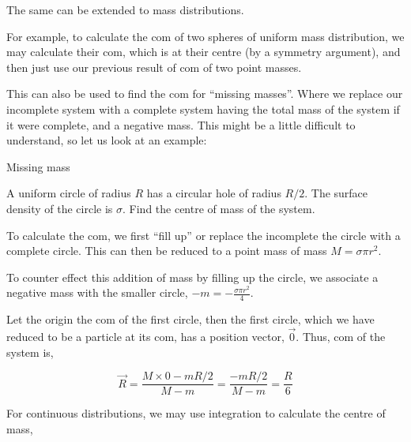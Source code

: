 The same can be extended to mass distributions.

For example, to calculate the com of two spheres of uniform mass distribution, 
we may calculate their com, which is at their centre (by a symmetry argument), and then just 
use our previous result of com of two point masses.

This can also be used to find the com for ``missing masses''. Where we replace 
our incomplete system with a complete system having the total mass of the system 
if it were complete, and a negative mass. This might be a little difficult 
to understand, so let us look at an example:


\begin{marginfigure}
    \centering
    \caption{Missing mass}\label{fig: missingmasscom}
\end{marginfigure}

\begin{example}
    A uniform circle of radius \(R\) has a circular hole of radius \(R/2\). The surface 
    density of the circle is \(\sigma\). Find the centre of mass of the system.
    \begin{soln}
        To calculate the com, we first ``fill up'' or replace the incomplete the circle with 
        a complete circle. This can then be reduced to a point mass of mass \(M = \sigma\pi r^2\).

        To counter effect this addition of mass by filling up the circle, we associate 
        a negative mass with the smaller circle, \(-m = -\frac{\sigma\pi r^2}{4}\).

        Let the origin the com of the first circle, then the first circle, which we have 
        reduced to be a particle at its com, has a position vector, \(\vec{0}\). 
        Thus, com of the system is,

        \begin{equation*}
            \Vec{R} = \frac{M \times 0 -mR/2}{M - m} = \frac{-mR/2}{M-m} = \frac{R}{6}
        \end{equation*}
    \end{soln}
\end{example}   

For continuous distributions, we may use integration to calculate the centre of mass,

